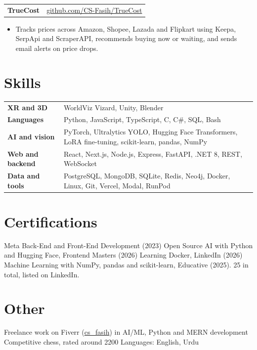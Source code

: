 \documentclass[a4paper,10pt]{article}
\makeatletter
\newcommand{\project}[4]{%
  \begin{tabularx}{\linewidth}{@{}X r@{}}
    \textbf{#1} \;{\color{muted}\small #2} & \small\href{#4}{#3} \\
  \end{tabularx}\vspace{-1pt}}
\makeatother
\begin{document}
\project{TrueCost}{React, TypeScript, Express, PostgreSQL, SendGrid}{github.com/CS-Fasih/TrueCost}{https://github.com/CS-Fasih/TrueCost}
\begin{itemize}
  \item Tracks prices across Amazon, Shopee, Lazada and Flipkart using Keepa, SerpApi and ScraperAPI, recommends buying now or waiting, and sends email alerts on price drops.
\end{itemize}

\section{Skills}
\begin{tabularx}{\linewidth}{@{}l@{\hspace{10pt}}X@{}}
  \textbf{XR and 3D}      & WorldViz Vizard, Unity, Blender \\
  \textbf{Languages}      & Python, JavaScript, TypeScript, C, C\#, SQL, Bash \\
  \textbf{AI and vision}  & PyTorch, Ultralytics YOLO, Hugging Face Transformers, LoRA fine-tuning, scikit-learn, pandas, NumPy \\
  \textbf{Web and backend}& React, Next.js, Node.js, Express, FastAPI, .NET 8, REST, WebSocket \\
  \textbf{Data and tools} & PostgreSQL, MongoDB, SQLite, Redis, Neo4j, Docker, Linux, Git, Vercel, Modal, RunPod \\
\end{tabularx}

\section{Certifications}
Meta Back-End and Front-End Development (2023) \;\textperiodcentered\;
Open Source AI with Python and Hugging Face, Frontend Masters (2026) \;\textperiodcentered\;
Learning Docker, LinkedIn (2026) \;\textperiodcentered\;
Machine Learning with NumPy, pandas and scikit-learn, Educative (2025). {\color{muted}25 in total, listed on LinkedIn.}

\section{Other}
Freelance work on Fiverr (\href{https://www.fiverr.com/cs_fasih}{cs\_fasih}) in AI/ML, Python and MERN development \;\textperiodcentered\;
Competitive chess, rated around 2200 \;\textperiodcentered\;
Languages: English, Urdu
\end{document}
